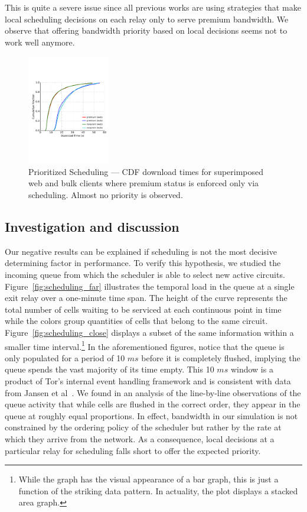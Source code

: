 This is quite a severe issue since all previous works are using strategies that
make local scheduling decisions on each relay only to serve premium bandwidth.
We observe that offering bandwidth priority based on local decisions seems not
to work well anymore.

\begin{figure} \centering
  \includegraphics[trim={0 3cm 0 3cm}, clip, width=0.32\textwidth]{images/scheduling_priority.pdf}
  \caption[Prioritized Scheduling]{Prioritized Scheduling --- CDF download
    times for superimposed web and bulk clients where premium status is enforced
    only via scheduling. Almost no priority is observed.}
  \label{fig:scheduling_priority}
\end{figure}

\subsection{Investigation and discussion}

Our negative results can be explained if scheduling is not the most decisive
determining factor in performance. To verify this hypothesis, we studied the
incoming queue from which the scheduler is able to select new active
circuits. Figure~\ref{fig:scheduling_far} illustrates the temporal load in the
queue at a single exit relay over a one-minute time span. The height of the
curve represents the total number of cells waiting to be serviced at each
continuous point in time while the colors group quantities of cells that belong
to the same circuit. Figure~\ref{fig:scheduling_close} displays a subset of the
same information within a smaller time interval.\footnote{While the graph has
  the visual appearance of a bar graph, this is just a function of the striking
  data pattern. In actuality, the plot displays a stacked area graph.} In the
aforementioned figures, notice that the queue is only populated for a period of
10 $ms$ before it is completely flushed, implying the queue spends the vast
majority of its time empty. This 10 $ms$ window is a product of Tor's internal
event handling framework and is consistent with data from Jansen et
al~\cite{jansen2017tor}. We found in an analysis of the line-by-line
observations of the queue activity that while cells are flushed in the correct
order, they appear in the queue at roughly equal proportions. In effect,
bandwidth in our simulation is not constrained by the ordering policy of the
scheduler but rather by the rate at which they arrive from the network. As a
consequence, local decisions at a particular relay for scheduling falls short
to offer the expected priority.


